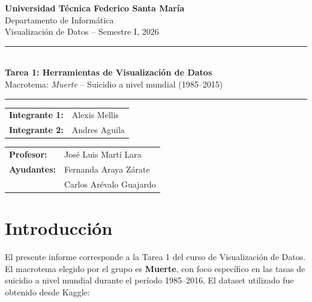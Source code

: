 \documentclass[12pt, letterpaper]{article}
\begin{document}
\begin{titlepage}
  \centering
  \vspace*{1.5cm}

  {\Large\bfseries Universidad Técnica Federico Santa María}\\[0.3cm]
  {\large Departamento de Informática}\\[0.2cm]
  {\large Visualización de Datos -- Semestre I, 2026}

  \vspace{1.5cm}
  \rule{\linewidth}{0.5pt}\\[0.4cm]
  {\LARGE\bfseries Tarea 1: Herramientas de Visualización de Datos}\\[0.2cm]
  {\large Macrotema: \textit{Muerte} -- Suicidio a nivel mundial (1985--2015)}
  \rule{\linewidth}{0.5pt}

  \vspace{1.5cm}

  \begin{tabular}{ll}
    \textbf{Integrante 1:} & Alexis Mellis \\[0.2cm]
    \textbf{Integrante 2:} & Andres Aguila \\
  \end{tabular}

  \vspace{1cm}

  \begin{tabular}{ll}
    \textbf{Profesor:}  & José Luis Martí Lara \\[0.3cm]
    \textbf{Ayudantes:}   & Fernanda Araya Zárate \\
                          & Carlos Arévalo Guajardo \\
  \end{tabular}

  \vfill

\end{titlepage}

\tableofcontents
\newpage

\section{Introducción}

El presente informe corresponde a la Tarea 1 del curso de Visualización de Datos. El macrotema
elegido por el grupo es \textbf{Muerte}, con foco específico en las tasas de suicidio a nivel mundial
durante el período 1985--2016. El dataset utilizado fue obtenido desde Kaggle:
\end{document}
